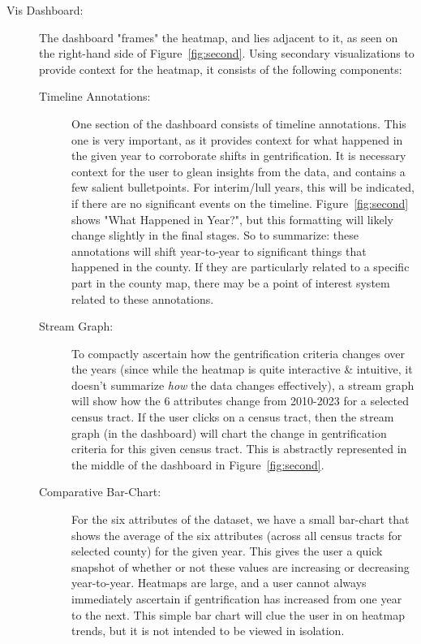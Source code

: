 \documentclass{article}
\begin{document}
\begin{description}
\begin{description}
        \item[Vis Dashboard:] The dashboard "frames" the heatmap, and lies adjacent to it, as seen on the right-hand side of Figure~\ref{fig:second}. Using secondary visualizations to provide context for the heatmap, it consists of the following components:
        
        \begin{description}
        
            \item[Timeline Annotations:] One section of the dashboard consists of timeline annotations. This one is very important, as it provides context for what happened in the given year to corroborate shifts in gentrification. It is necessary context for the user to glean insights from the data, and contains a few salient bulletpoints. For interim/lull years, this will be indicated, if there are no significant events on the timeline. Figure~\ref{fig:second} shows "What Happened in Year?", but this formatting will likely change slightly in the final stages. So to summarize: these annotations will shift year-to-year to significant things that happened in the county. If they are particularly related to a specific part in the county map, there may be a point of interest system related to these annotations.
            
            \item[Stream Graph:] To compactly ascertain how the gentrification criteria changes over the years (since while the heatmap is quite interactive \& intuitive, it doesn't summarize \textit{how} the data changes effectively), a stream graph will show how the 6 attributes change from 2010-2023 for a selected census tract. If the user clicks on a census tract, then the stream graph (in the dashboard) will chart the change in gentrification criteria for this given census tract. This is abstractly represented in the middle of the dashboard in Figure~\ref{fig:second}.
            
            \item[Comparative Bar-Chart:] For the six attributes of the dataset, we have a small bar-chart that shows the average of the six attributes (across all census tracts for selected county) for the given year. This gives the user a quick snapshot of whether or not these values are increasing or decreasing year-to-year. Heatmaps are large, and a user cannot always immediately ascertain if gentrification has increased from one year to the next. This simple bar chart will clue the user in on heatmap trends, but it is not intended to be viewed in isolation.
            
        \end{description}
        
    \end{description}
    
\end{description}
\end{document}
